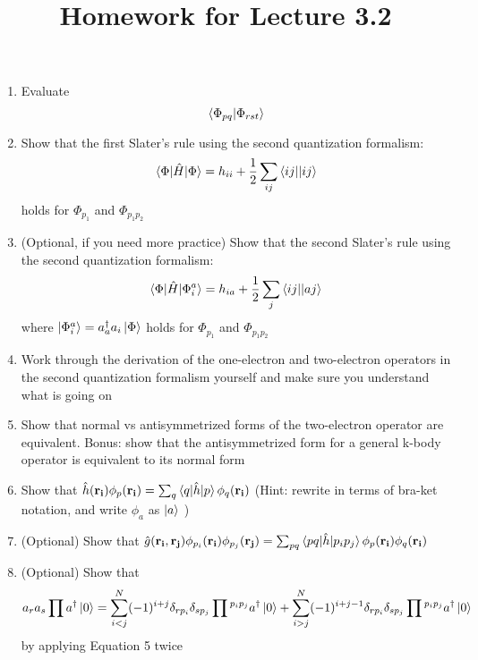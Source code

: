 \documentclass{article}
\title{Homework for Lecture 3.2 }
\date{}
\newcommand{\dg}{\ensuremath{^\dagger} }
\def\*#1{\mathbf{#1}}
\begin{document}
\maketitle
\noindent
\begin{enumerate}
\item Evaluate \[\braket{\Phi_{pq} | \Phi_{rst}} \]
\item Show that the first Slater's rule using the second quantization formalism: 
\[\braket{\Phi | \hat{H} | \Phi} = h_{ii} + \frac{1}{2} \sum_{ij} \braket{ij || ij} \]
holds for $\Phi_{p_1}$ and $\Phi_{p_1 p_2}$
\item (Optional, if you need more practice) Show that the second Slater's rule using the second quantization formalism: 
\[\braket{\Phi | \hat{H} | \Phi_i^a } = h_{ia} + \frac{1}{2} \sum_{j} \braket{ij || aj} \]
where $\ket{\Phi_i^a } = a_a\dg a_i \ket{\Phi}$ holds for $\Phi_{p_1}$ and $\Phi_{p_1 p_2}$
\item Work through the derivation of the one-electron and two-electron operators in the second quantization formalism yourself and make sure you understand what is going on 
\item Show that normal vs antisymmetrized forms of the two-electron operator are equivalent. Bonus: show that the antisymmetrized form for a general k-body operator is equivalent to its normal form 
\item Show that $\hat{h}(\*{r_i}) \phi_p (\*{r_i})  = \sum_q \braket{q | \hat{h} | p } \phi_q (\*{r_i}) $ (Hint: rewrite in terms of bra-ket notation, and write $\phi_a$ as $\ket{a}$ )
\item (Optional) Show that $\hat{g}(\*{r_i}, \*{r_j}) \phi_{p_i} (\*{r_i}) \phi_{p_j} (\*{r_j}) =  \sum_{pq} \braket{pq | \hat{h} | p_i p_j  }  \phi_p (\*{r_i})  \phi_q (\*{r_i})$
\item (Optional) Show that 
\[a_r a_s \prod a\dg \ket{0} = \sum\limits_{i < j} ^N  (-1)^{i + j }   \delta_{rp_i} \delta_{sp_j}  \prod{}^{p_ip_j} a\dg \ket{0} + 
\sum\limits_{i > j} ^N  (-1)^{i + j -1} \delta_{rp_i} \delta_{sp_j} \prod{}^{p_ip_j}a\dg \ket{0} \]
by applying Equation 5 twice 
\end{enumerate}
\end{document}
